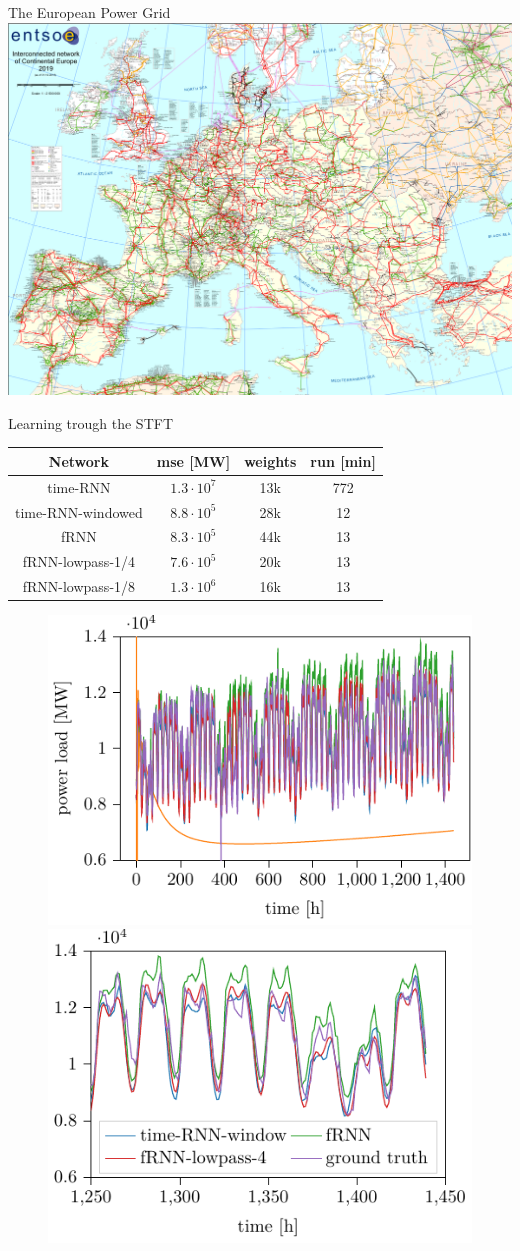 \documentclass[xcolor=dvipsnames]{beamer}
\begin{document}
\begin{frame}{The European Power Grid}
\centering
\includegraphics[width=.8\linewidth]{./img/power_grid.png}
\end{frame}



\begin{frame}{Learning trough the STFT \cite{wolter2018Fourier}}
\centering
\begin{tabular}{c c c c}
  Network   & mse [MW] & weights  & run [min]  \\\hline 
  time-RNN   & $1.3 \cdot 10^7$&  13k & 772 \\
  time-RNN-windowed   & $8.8 \cdot 10^5$&  28k & 12 \\
  fRNN   & $8.3 \cdot 10^5$&  44k & 13 \\
  fRNN-lowpass-1/4   & $7.6 \cdot 10^5$&  20k & 13 \\
  fRNN-lowpass-1/8   & $1.3 \cdot 10^6$&  16k & 13 \\
\end{tabular}
\begin{figure}
    \centering
    \includegraphics[width=0.48\linewidth]{./img/comparison_60d_fit.pdf}
    \includegraphics[width=0.48\linewidth]{./img/comparison_last_week_60d_fit.pdf}
\end{figure}
\end{frame}
\end{document}

